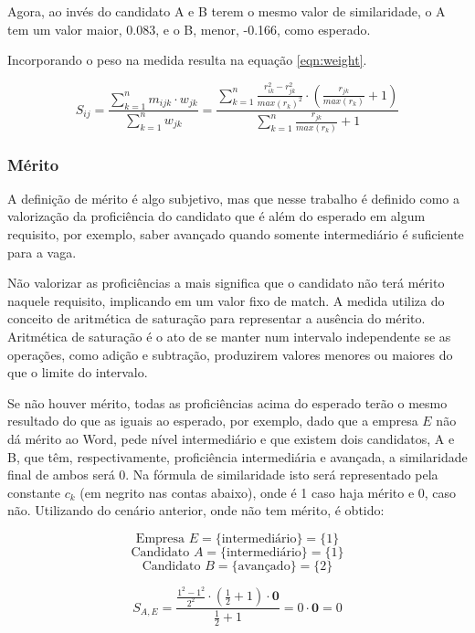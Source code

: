 \documentclass[preprint,12pt]{elsarticle}
\begin{document}
Agora, ao invés do candidato A e B terem o mesmo valor de similaridade, o A tem um valor maior, 0.083, e o B, menor, -0.166, como esperado.

Incorporando o peso na medida resulta na equação \ref{eqn:weight}. 

\begin{equation}
\label{eqn:weighted-sim}
S_{ij} = \frac{\sum_{k=1}^n m_{ijk} \cdot w_{jk}}
              {\sum_{k=1}^n w_{jk}} = 
         \frac{\sum_{k=1}^n \frac{r_{ik}^2 - r_{jk}^2}{max(r_k)^2} \cdot (\frac{r_{jk}}{max(r_k)} + 1)}
              {\sum_{k=1}^n {\frac{r_{jk}}{max(r_k)} + 1}}
\end{equation}

\subsubsection{Mérito}
\label{sssec:merit}

A definição de mérito é algo subjetivo, mas que nesse trabalho é definido como a valorização da proficiência do candidato que é além do esperado em algum requisito, por exemplo, saber avançado quando somente intermediário é suficiente para a vaga. 

Não valorizar as proficiências a mais significa que o candidato não terá mérito naquele requisito, implicando em um valor fixo de match. A medida utiliza do conceito de  aritmética de saturação para representar a ausência do mérito. Aritmética de saturação é o ato de se manter num intervalo independente se as operações, como adição e subtração, produzirem valores menores ou maiores do que o limite do intervalo.

Se não houver mérito, todas as proficiências acima do esperado terão o mesmo resultado do que as iguais ao esperado, por exemplo, dado que a empresa $E$ não dá mérito ao Word, pede nível intermediário e que existem dois candidatos, A e B, que têm, respectivamente, proficiência intermediária e avançada, a similaridade final de ambos será 0. Na fórmula de similaridade isto será representado pela constante $c_{k}$ (em negrito nas contas abaixo), onde é 1 caso haja mérito e 0, caso não. Utilizando do cenário anterior, onde não tem mérito, é obtido:


$$ \text{Empresa } E = \{ \text{intermediário} \} = \{ 1 \} $$
$$ \text{Candidato } A = \{ \text{intermediário} \} = \{ 1 \} $$
$$ \text{Candidato } B = \{ \text{avançado} \} = \{ 2 \} $$


$$ S_{A,E} = \frac{\tfrac{1^2 - 1^2}{2^2} \cdot (\tfrac{1}{2} + 1) \cdot \textbf{0}}
                  {\tfrac{1}{2} + 1}
           = 0 \cdot \textbf{0} = 0 $$
\end{document}
